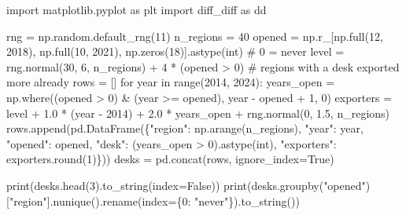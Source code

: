 \documentclass[
  letterpaper,
  10pt,
  twoside,
  openright,
  numbers=noenddot,
  chapterprefix=true]{scrbook}
\newenvironment{Shaded}{}{}
\newcommand{\BuiltInTok}[1]{\textcolor[rgb]{0.84,0.23,0.29}{#1}}
\newcommand{\CommentTok}[1]{\textcolor[rgb]{0.42,0.45,0.49}{#1}}
\newcommand{\ControlFlowTok}[1]{\textcolor[rgb]{0.84,0.23,0.29}{#1}}
\newcommand{\DecValTok}[1]{\textcolor[rgb]{0.00,0.36,0.77}{#1}}
\newcommand{\FloatTok}[1]{\textcolor[rgb]{0.00,0.36,0.77}{#1}}
\newcommand{\ImportTok}[1]{\textcolor[rgb]{0.01,0.18,0.38}{#1}}
\newcommand{\KeywordTok}[1]{\textcolor[rgb]{0.84,0.23,0.29}{#1}}
\newcommand{\NormalTok}[1]{\textcolor[rgb]{0.14,0.16,0.18}{#1}}
\newcommand{\OperatorTok}[1]{\textcolor[rgb]{0.14,0.16,0.18}{#1}}
\newcommand{\StringTok}[1]{\textcolor[rgb]{0.01,0.18,0.38}{#1}}
\newcommand{\VariableTok}[1]{\textcolor[rgb]{0.89,0.38,0.04}{#1}}
\begin{document}
\label{check-desks-panel}
\begin{Shaded}
\begin{Highlighting}[]
\ImportTok{import}\NormalTok{ matplotlib.pyplot }\ImportTok{as}\NormalTok{ plt}
\ImportTok{import}\NormalTok{ diff\_diff }\ImportTok{as}\NormalTok{ dd}

\NormalTok{rng }\OperatorTok{=}\NormalTok{ np.random.default\_rng(}\DecValTok{11}\NormalTok{)}
\NormalTok{n\_regions }\OperatorTok{=} \DecValTok{40}
\NormalTok{opened }\OperatorTok{=}\NormalTok{ np.r\_[np.full(}\DecValTok{12}\NormalTok{, }\DecValTok{2018}\NormalTok{), np.full(}\DecValTok{10}\NormalTok{, }\DecValTok{2021}\NormalTok{), np.zeros(}\DecValTok{18}\NormalTok{)].astype(}\BuiltInTok{int}\NormalTok{)   }\CommentTok{\# 0 = never}
\NormalTok{level }\OperatorTok{=}\NormalTok{ rng.normal(}\DecValTok{30}\NormalTok{, }\DecValTok{6}\NormalTok{, n\_regions) }\OperatorTok{+} \DecValTok{4} \OperatorTok{*}\NormalTok{ (opened }\OperatorTok{\textgreater{}} \DecValTok{0}\NormalTok{)     }\CommentTok{\# regions with a desk exported more already}
\NormalTok{rows }\OperatorTok{=}\NormalTok{ []}
\ControlFlowTok{for}\NormalTok{ year }\KeywordTok{in} \BuiltInTok{range}\NormalTok{(}\DecValTok{2014}\NormalTok{, }\DecValTok{2024}\NormalTok{):}
\NormalTok{    years\_open }\OperatorTok{=}\NormalTok{ np.where((opened }\OperatorTok{\textgreater{}} \DecValTok{0}\NormalTok{) }\OperatorTok{\&}\NormalTok{ (year }\OperatorTok{\textgreater{}=}\NormalTok{ opened), year }\OperatorTok{{-}}\NormalTok{ opened }\OperatorTok{+} \DecValTok{1}\NormalTok{, }\DecValTok{0}\NormalTok{)}
\NormalTok{    exporters }\OperatorTok{=}\NormalTok{ level }\OperatorTok{+} \FloatTok{1.0} \OperatorTok{*}\NormalTok{ (year }\OperatorTok{{-}} \DecValTok{2014}\NormalTok{) }\OperatorTok{+} \FloatTok{2.0} \OperatorTok{*}\NormalTok{ years\_open }\OperatorTok{+}\NormalTok{ rng.normal(}\DecValTok{0}\NormalTok{, }\FloatTok{1.5}\NormalTok{, n\_regions)}
\NormalTok{    rows.append(pd.DataFrame(\{}\StringTok{"region"}\NormalTok{: np.arange(n\_regions), }\StringTok{"year"}\NormalTok{: year, }\StringTok{"opened"}\NormalTok{: opened,}
                              \StringTok{"desk"}\NormalTok{: (years\_open }\OperatorTok{\textgreater{}} \DecValTok{0}\NormalTok{).astype(}\BuiltInTok{int}\NormalTok{),}
                              \StringTok{"exporters"}\NormalTok{: exporters.}\BuiltInTok{round}\NormalTok{(}\DecValTok{1}\NormalTok{)\}))}
\NormalTok{desks }\OperatorTok{=}\NormalTok{ pd.concat(rows, ignore\_index}\OperatorTok{=}\VariableTok{True}\NormalTok{)}

\BuiltInTok{print}\NormalTok{(desks.head(}\DecValTok{3}\NormalTok{).to\_string(index}\OperatorTok{=}\VariableTok{False}\NormalTok{))}
\BuiltInTok{print}\NormalTok{(desks.groupby(}\StringTok{"opened"}\NormalTok{)[}\StringTok{"region"}\NormalTok{].nunique().rename(index}\OperatorTok{=}\NormalTok{\{}\DecValTok{0}\NormalTok{: }\StringTok{"never"}\NormalTok{\}).to\_string())}
\end{Highlighting}
\end{Shaded}
\end{document}
